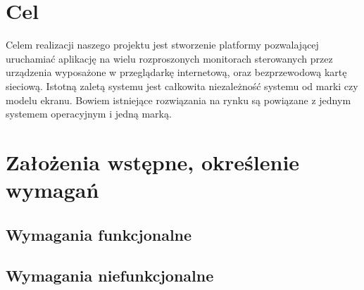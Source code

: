 \section{Cel}
Celem realizacji naszego projektu jest stworzenie platformy pozwalającej uruchamiać aplikację na wielu rozproszonych monitorach sterowanych przez urządzenia wyposażone w przeglądarkę internetową, oraz bezprzewodową kartę sieciową.  
Istotną zaletą systemu jest całkowita niezależność systemu od marki czy modelu ekranu. Bowiem istniejące rozwiązania na rynku są powiązane z jednym systemem operacyjnym i jedną marką.

\section{Założenia wstępne, określenie wymagań}

\subsection{Wymagania funkcjonalne}



\subsection{Wymagania niefunkcjonalne}


